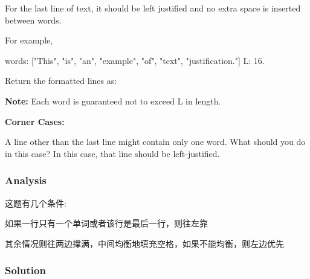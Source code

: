 For the last line of text, it should be left justified and no extra space is inserted between words.

For example,
\begin{Code}
words: ["This", "is", "an", "example", "of", "text", "justification."]
L: 16.
\end{Code}

Return the formatted lines as:
\begin{Code}
\end{Code}

\textbf{Note:} Each word is guaranteed not to exceed L in length.

\textbf{Corner Cases:}

A line other than the last line might contain only one word. What should you do in this case? In this case, that line should be left-justified.

\subsubsection{Analysis}
这题有几个条件:

如果一行只有一个单词或者该行是最后一行，则往左靠

其余情况则往两边撑满，中间均衡地填充空格，如果不能均衡，则左边优先

\newpage

\subsubsection{Solution}

